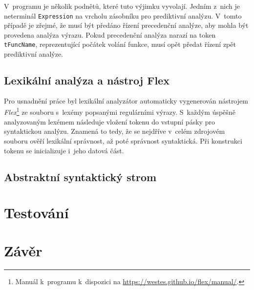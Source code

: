 \begin{figure}
    \caption{}
    \label{fig_schema_zmeny_parseru}
\end{figure}

V~programu je několik podnětů, které tuto výjimku vyvolají.
Jedním z~nich je neterminál \texttt{Expression} na vrcholu zásobníku pro prediktivní analýzu.
V~tomto případě je zřejmé, že musí být předáno řízení precedenční analýze, aby mohla být provedena analýza výrazu.
Pokud precedenční analýza narazí na token \texttt{tFuncName}, reprezentující počátek volání funkce, musí opět předat řízení zpět prediktivní analýze.


\begin{figure}[h]
    \caption{}
\end{figure}

\section{Lexikální analýza a nástroj Flex}
Pro usnadnění práce byl lexikální analyzátor automaticky vygenerován nástrojem \emph{Flex}\footnote{Manuál k~programu k~dispozici na \href{https://westes.github.io/flex/manual/}{https://westes.github.io/flex/manual/}.} ze souboru s~lexémy popsanými regulárními výrazy.
S~každým úspěšně analyzovaným lexémem následuje vložení tokenu do vstupní pásky pro syntaktickou analýzu.
Znamená to tedy, že se nejdříve v~celém zdrojovém souboru ověří lexikální správnost, až poté správnost syntaktická. 
Při konstrukci tokenu se inicializuje i~jeho datová část.

\section{Abstraktní syntaktický strom}

\chapter{Testování}

\chapter{Závěr}
